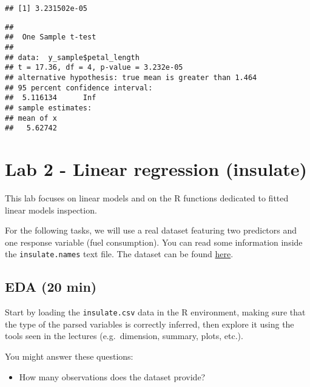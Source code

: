 \documentclass[
  oneside]{book}
\newenvironment{Shaded}{\begin{snugshade}}{\end{snugshade}}
\newcommand{\AttributeTok}[1]{\textcolor[rgb]{0.77,0.63,0.00}{#1}}
\newcommand{\CommentTok}[1]{\textcolor[rgb]{0.56,0.35,0.01}{\textit{#1}}}
\newcommand{\FunctionTok}[1]{\textcolor[rgb]{0.00,0.00,0.00}{#1}}
\newcommand{\NormalTok}[1]{#1}
\newcommand{\SpecialCharTok}[1]{\textcolor[rgb]{0.00,0.00,0.00}{#1}}
\newcommand{\StringTok}[1]{\textcolor[rgb]{0.31,0.60,0.02}{#1}}
\providecommand{\tightlist}{%
  \setlength{\itemsep}{0pt}\setlength{\parskip}{0pt}}
\begin{document}
\begin{verbatim}
## [1] 3.231502e-05
\end{verbatim}

\begin{Shaded}
\end{Shaded}

\begin{verbatim}
## 
##  One Sample t-test
## 
## data:  y_sample$petal_length
## t = 17.36, df = 4, p-value = 3.232e-05
## alternative hypothesis: true mean is greater than 1.464
## 95 percent confidence interval:
##  5.116134      Inf
## sample estimates:
## mean of x 
##   5.62742
\end{verbatim}

\hypertarget{lab-2---linear-regression-insulate}{%
\chapter{Lab 2 - Linear regression (insulate)}\label{lab-2---linear-regression-insulate}}

This lab focuses on linear models and on the R functions
dedicated to fitted linear models inspection.

For the following tasks, we will use a real dataset
featuring two predictors and one response variable (fuel consumption).
You can read some information inside the \texttt{insulate.names} text file.
The dataset can be found \href{https://github.com/toyo97/statistical-models-r/tree/master/datasets}{here}.

\hypertarget{eda-20-min}{%
\section{EDA (20 min)}\label{eda-20-min}}

Start by loading the \texttt{insulate.csv} data in the R environment,
making sure that the type of the parsed variables is correctly inferred,
then explore it using the tools seen in the lectures (e.g.~dimension,
summary, plots, etc.).

You might answer these questions:

\begin{itemize}
\tightlist
\item
  How many observations does the dataset provide?
\end{itemize}
\end{document}
